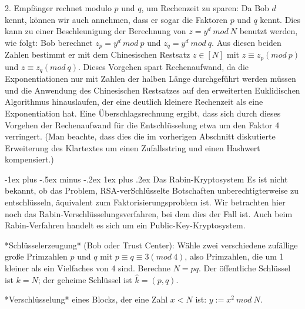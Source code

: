 \documentclass[a4paper]{article}
\makeatletter
\renewcommand{\subsubsection}{\@startsection{subsubsection}{3}{0mm}%
 {-1ex plus -.5ex minus -.2ex}%
 {1ex plus .2ex}%
 {\normalfont\small\bfseries}}
\makeatother
\begin{document}
\begin{multicols}{3}
        2. Empfänger rechnet modulo $p$ und $q$, um Rechenzeit zu sparen: Da Bob $d$ kennt, können wir auch annehmen, dass er sogar die Faktoren $p$ und $q$ kennt. Dies kann zu einer Beschleunigung der Berechnung von $z=y^d\ mod\ N$ benutzt werden, wie folgt: Bob berechnet $z_p=y^d\ mod\ p$ und $z_q=y^d\ mod\ q$. Aus diesen beiden Zahlen bestimmt er mit dem Chinesischen Restsatz $z\in [N]$ mit $z\equiv z_p (mod\ p)$ und $z\equiv z_q(mod\ q)$. Dieses Vorgehen spart Rechenaufwand, da die Exponentiationen nur mit Zahlen der halben Länge durchgeführt werden müssen und die Anwendung des Chinesischen Restsatzes auf den erweiterten Euklidischen Algorithmus hinauslaufen, der eine deutlich kleinere Rechenzeit als eine Exponentiation hat.
        Eine Überschlagsrechnung ergibt, dass sich durch dieses Vorgehen der Rechenaufwand für die Entschlüsselung etwa um den Faktor 4 verringert. (Man beachte, dass dies die im vorherigen Abschnitt diskutierte Erweiterung des Klartextes um einen Zufallsstring und einen Hashwert kompensiert.)

        \subsubsection{Das Rabin-Kryptosystem}
        Es ist nicht bekannt, ob das Problem, RSA-verSchlüsselte Botschaften unberechtigterweise zu entschlüsseln, äquivalent zum Faktorisierungsproblem ist. Wir betrachten hier noch das Rabin-Verschlüsselungsverfahren, bei dem dies der Fall ist. Auch beim Rabin-Verfahren handelt es sich um ein Public-Key-Kryptosystem.

        *Schlüsselerzeugung* (Bob oder Trust Center): Wähle zwei verschiedene zufällige große Primzahlen $p$ und $q$ mit $p\equiv q\equiv 3 (mod\ 4)$, also Primzahlen, die um 1 kleiner als ein Vielfaches von 4 sind. Berechne $N=pq$. Der öffentliche Schlüssel ist $k=N$; der geheime Schlüssel ist $\hat{k}= (p,q)$.

        *Verschlüsselung* eines Blocks, der eine Zahl $x<N$ ist: $y:=x^2\ mod\ N$.


\end{multicols}
\end{document}
